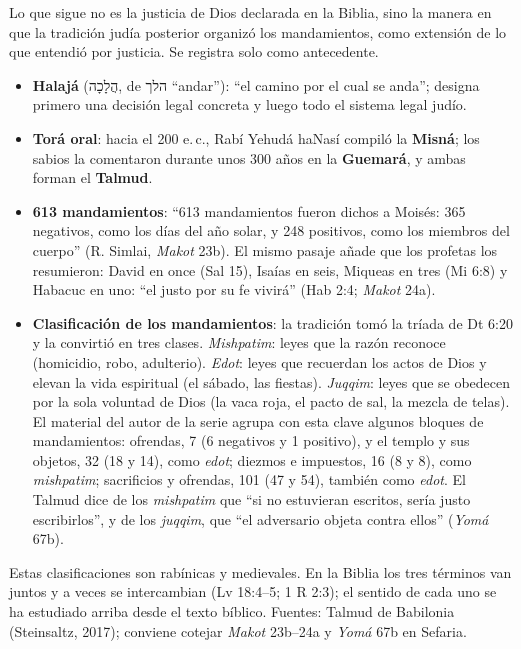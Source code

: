 \documentclass[11pt,letterpaper]{article}
\newcommand{\heb}[1]{\mbox{\foreignlanguage{hebrew}{#1}}}
\begin{document}
\begin{nota}
Lo que sigue no es la justicia de Dios declarada en la Biblia, sino la manera en que la tradición judía posterior organizó los mandamientos, como extensión de lo que entendió por justicia. Se registra solo como antecedente.
\begin{itemize}\setlength{\itemsep}{1pt}
\item \textbf{Halajá} (\heb{הֲלָכָה}, de \heb{הלך} ``andar''): ``el camino por el cual se anda''; designa primero una decisión legal concreta y luego todo el sistema legal judío.
\item \textbf{Torá oral}: hacia el 200 e.\,c., Rabí Yehudá haNasí compiló la \textbf{Misná}; los sabios la comentaron durante unos 300 años en la \textbf{Guemará}, y ambas forman el \textbf{Talmud}.
\item \textbf{613 mandamientos}: ``613 mandamientos fueron dichos a Moisés: 365 negativos, como los días del año solar, y 248 positivos, como los miembros del cuerpo'' (R. Simlai, \emph{Makot} 23b). El mismo pasaje añade que los profetas los resumieron: David en once (Sal 15), Isaías en seis, Miqueas en tres (Mi 6:8) y Habacuc en uno: ``el justo por su fe vivirá'' (Hab 2:4; \emph{Makot} 24a).
\item \textbf{Clasificación de los mandamientos}: la tradición tomó la tríada de Dt 6:20 y la convirtió en tres clases. \emph{Mishpatim}: leyes que la razón reconoce (homicidio, robo, adulterio). \emph{Edot}: leyes que recuerdan los actos de Dios y elevan la vida espiritual (el sábado, las fiestas). \emph{Juqqim}: leyes que se obedecen por la sola voluntad de Dios (la vaca roja, el pacto de sal, la mezcla de telas). El material del autor de la serie agrupa con esta clave algunos bloques de mandamientos: ofrendas, 7 (6 negativos y 1 positivo), y el templo y sus objetos, 32 (18 y 14), como \emph{edot}; diezmos e impuestos, 16 (8 y 8), como \emph{mishpatim}; sacrificios y ofrendas, 101 (47 y 54), también como \emph{edot}. El Talmud dice de los \emph{mishpatim} que ``si no estuvieran escritos, sería justo escribirlos'', y de los \emph{juqqim}, que ``el adversario objeta contra ellos'' (\emph{Yomá} 67b).
\end{itemize}
Estas clasificaciones son rabínicas y medievales. En la Biblia los tres términos van juntos y a veces se intercambian (Lv 18:4--5; 1 R 2:3); el sentido de cada uno se ha estudiado arriba desde el texto bíblico. Fuentes: Talmud de Babilonia (Steinsaltz, 2017); conviene cotejar \emph{Makot} 23b--24a y \emph{Yomá} 67b en Sefaria.
\end{nota}
\end{document}
